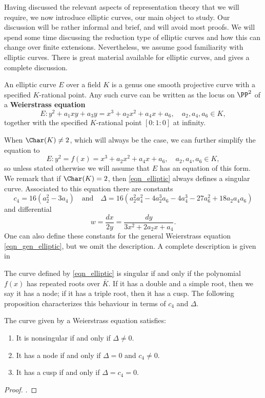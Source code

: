 
Having discussed the relevant aspects of representation theory that we will require, we now introduce elliptic curves, our main object to study. Our discussion will be rather informal and brief, and will avoid most proofs. We will spend some time discussing the reduction type of elliptic curves and how this can change over finite extensions. Nevertheless, we assume good familiarity with elliptic curves. There is great material available for elliptic curves, and \cite{S1} gives a complete discussion.

An elliptic curve $E$ over a field $K$ is a genus one smooth projective curve with a specified $K$-rational point. Any such curve can be written as the locus on $\PP^2$ of a \textbf{Weierstrass equation}
\begin{equation}\label{eqn_gen_elliptic}
    E: y^2+a_1xy+a_3y=x^3+a_2x^2+a_4x+a_6,\quad a_2,a_4,a_6\in K,
\end{equation}
together with the specified $K$-rational point $[0:1:0]$ at infinity.

When $\Char(K)\neq2$, which will always be the case, we can further simplify the equation to
\begin{equation}\label{eqn_elliptic}
    E: y^2=f(x)=x^3+a_2x^2+a_4x+a_6,\quad a_2,a_4,a_6\in K,
\end{equation}
so unless stated otherwise we will assume that $E$ has an equation of this form. We remark that if $\Char(K)=2$, then \eqref{eqn_elliptic} always defines a singular curve. Associated to this equation there are constants 
$$c_4=16(a_2^2-3a_4) \quad\text{and}\quad \Delta=16(a_2^2a_4^2-4a_2^3a_6-4a_4^3-27a_6^2+18a_2a_4a_6)$$
and differential 
\begin{equation}\label{eqn_differential}
    w=\frac{dx}{2y}=\frac{dy}{3x^2+2a_2x+a_4}.
\end{equation}
One can also define these constants for the general Weierstrass equation \eqref{eqn_gen_elliptic}, but we omit the description. A complete description is given in \cite[\S III.1]{S1}

The curve defined by \eqref{eqn_elliptic} is singular if and only if the polynomial $f(x)$ has repeated roots over $\bar{K}$. If it has a double and a simple root, then we say it has a node; if it has a triple root, then it has a cusp. The following proposition characterizes this behaviour in terms of $c_4$ and $\Delta$.

\begin{prop}\label{prop_nodecusp}
    The curve given by a Weierstrass equation satisfies:
    \begin{enumerate}
        \item It is nonsingular if and only if $\Delta\neq0$.
        \item It has a node if and only if $\Delta=0$ and $c_4 \neq 0$.
        \item It has a cusp if and only if $\Delta= c_4 = 0$. 
    \end{enumerate}
\end{prop}
\begin{proof}
    \cite[\S III Proposition 1.4]{S1}.
\end{proof}

